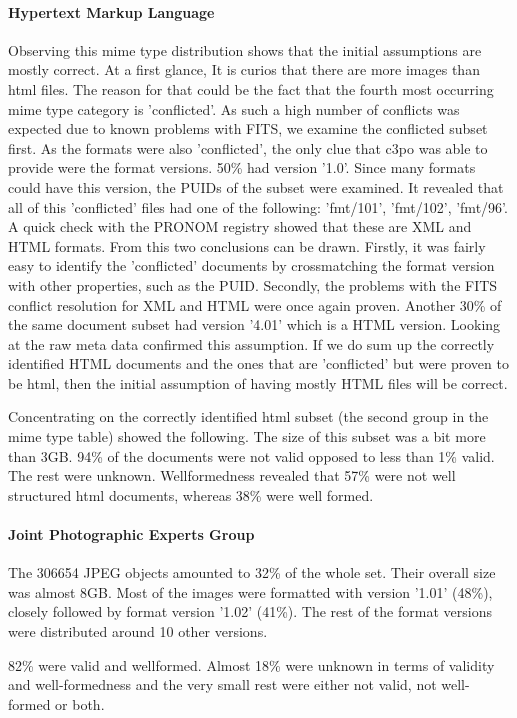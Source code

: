 \paragraph{Hypertext Markup Language}
Observing this mime type distribution shows that the initial assumptions are mostly correct. At a first glance, It is curios that there are more images than html files. The reason for that could be the fact that the fourth most occurring mime type category is 'conflicted'. As such a high number of conflicts was expected due to known problems with FITS, we examine the conflicted subset first. As the formats were also 'conflicted', the only clue that c3po was able to provide were the format versions. 50\% had version '1.0'. Since many formats could have this version, the PUIDs of the subset were examined. It revealed that all of this 'conflicted' files had one of the following: 'fmt/101', 'fmt/102', 'fmt/96'. A quick check with the PRONOM registry showed that these are XML and HTML formats. From this two conclusions can be drawn. Firstly, it was fairly easy to identify the 'conflicted' documents by crossmatching the format version with other properties, such as the PUID. Secondly, the problems with the FITS conflict resolution for XML and HTML were once again proven.
Another 30\% of the same document subset had version '4.01' which is a HTML version. Looking at the raw meta data confirmed this assumption. If we do sum up the correctly identified HTML documents and the ones that are 'conflicted' but were proven to be html, then the initial assumption of having mostly HTML files will be correct.

Concentrating on the correctly identified html subset (the second group in the mime type table) showed the following.
The size of this subset was a bit more than 3GB. 94\% of the documents were not valid opposed to less than 1\% valid. The rest were unknown. Wellformedness revealed that 57\% were not well structured html documents, whereas 38\% were well formed.

\paragraph{Joint Photographic Experts Group}
The 306654 JPEG objects amounted to 32\% of the whole set. Their overall size was almost 8GB.
Most of the images were formatted with version '1.01' (48\%), closely followed by format version '1.02' (41\%). The rest of the format versions were distributed around 10 other versions.

82\% were valid and wellformed. Almost 18\% were unknown in terms of validity and well-formedness and the very small rest were either not valid, not well-formed or both.

